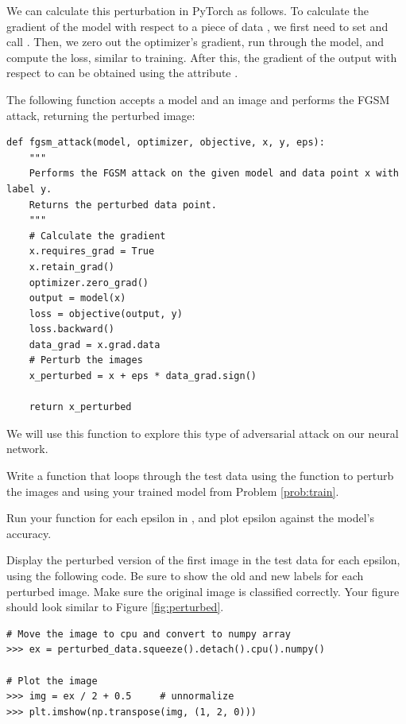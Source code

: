 We can calculate this perturbation in PyTorch as follows.
To calculate the gradient of the model with respect to a piece of data , we first need to set  and call .
Then, we zero out the optimizer's gradient, run  through the model, and compute the loss, similar to training.
After this, the gradient of the output with respect to  can be obtained using the attribute .

The following function  accepts a model and an image and performs the FGSM attack, returning the perturbed image:
\newpage
\begin{lstlisting}[belowskip=-0.8 \baselineskip]
def fgsm_attack(model, optimizer, objective, x, y, eps):
    """
    Performs the FGSM attack on the given model and data point x with label y.
    Returns the perturbed data point.
    """
    # Calculate the gradient
    x.requires_grad = True
    x.retain_grad()
    optimizer.zero_grad()
    output = model(x)
    loss = objective(output, y)
    loss.backward()
    data_grad = x.grad.data
    # Perturb the images
    x_perturbed = x + eps * data_grad.sign()

    return x_perturbed
\end{lstlisting}
We will use this function to explore this type of adversarial attack on our neural network.

\begin{problem}
Write a function that loops through the test data using the function  to perturb the images and using your trained model from Problem \ref{prob:train}.

Run your function for each epsilon in \li{[0, 0.05, 0.1, 0.15, 0.2, 0.25, 0.3]}, and plot epsilon against the model's accuracy.

Display the perturbed version of the first image in the test data for each epsilon, using the following code. Be sure to show the old and new labels for each perturbed image. Make sure the original image is classified correctly.
Your figure should look similar to Figure \ref{fig:perturbed}.

\begin{lstlisting}
# Move the image to cpu and convert to numpy array
>>> ex = perturbed_data.squeeze().detach().cpu().numpy()

# Plot the image
>>> img = ex / 2 + 0.5     # unnormalize
>>> plt.imshow(np.transpose(img, (1, 2, 0)))
\end{lstlisting}

\label{problem:adv}
\end{problem}

